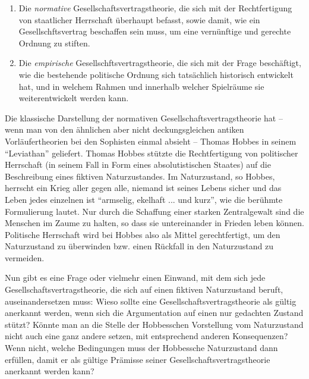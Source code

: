 \documentclass[12pt,a4paper,ngerman]{article}
\begin{document}
\begin{enumerate}

\item Die {\em normative} Gesellschaftsvertragstheorie, die sich mit der
Rechtfertigung von staatlicher Herrschaft überhaupt befasst, sowie damit, wie
ein Gesellschftsvertrag beschaffen sein muss, um eine vernünftige und gerechte
Ordnung zu stiften.

\item Die {\em empirische} Gesellschftsvertragstheorie, die sich mit der Frage
beschäftigt, wie die bestehende politische Ordnung sich tatsächlich historisch
entwickelt hat, und in welchem Rahmen und innerhalb welcher Spielräume sie
weiterentwickelt werden kann.

\end{enumerate}

Die klassische Darstellung der normativen Gesellschaftsvertragstheorie
hat -- wenn man von den ähnlichen aber nicht deckungsgleichen antiken
Vorläufertheorien bei den Sophisten einmal absieht -- Thomas Hobbes in
seinem "`Leviathan"' geliefert\cite{hobbes:1651}. Thomas Hobbes
stützte die Rechtfertigung von politischer Herrschaft (in seinem Fall
in Form eines absolutistischen Staates) auf die Beschreibung eines
fiktiven Naturzustandes. Im Naturzustand, so Hobbes, herrscht ein
Krieg aller gegen alle, niemand ist seines Lebens sicher und das Leben
jedes einzelnen ist "`armselig, ekelhaft ... und
kurz"'\cite[S. 96]{hobbes:1651}, wie die berühmte Formulierung
lautet. Nur durch die Schaffung einer starken Zentralgewalt sind die
Menschen im Zaume zu halten, so dass sie untereinander in Frieden
leben können. Politische Herrschaft wird bei Hobbes also als Mittel
gerechtfertigt, um den Naturzustand zu überwinden bzw. einen Rückfall
in den Naturzustand zu vermeiden.

Nun gibt es eine Frage oder vielmehr einen Einwand, mit dem sich jede
Gesellschaftsvertragstheorie, die sich auf einen fiktiven Naturzustand beruft,
auseinandersetzen muss: Wieso sollte eine Gesellschaftsvertragstheorie als
gültig anerkannt werden, wenn sich die Argumentation auf einen nur gedachten
Zustand stützt? Könnte man an die Stelle der Hobbesschen Vorstellung vom
Naturzustand nicht auch eine ganz andere setzen, mit entsprechend anderen
Konsequenzen? Wenn nicht, welche Bedingungen muss der Hobbessche
Naturzustand dann erfüllen, damit er als gültige Prämisse seiner
Gesellschaftsvertragstheorie anerkannt werden kann?
\end{document}
